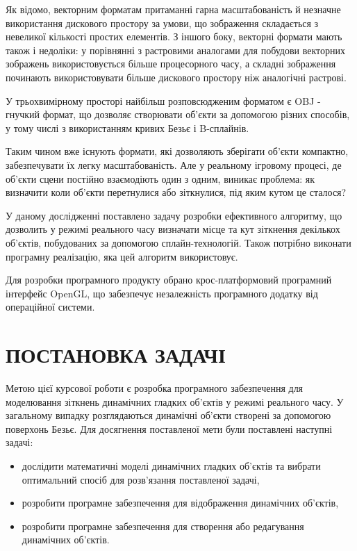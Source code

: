 \documentclass[14pt,a4paper]{extarticle}
\theoremstyle{definition}
\renewcommand{\[}{\begin{singlespace}\begin{equation*}}
\renewcommand{\]}{\end{equation*}\end{singlespace}}
\begin{document}
Як відомо, векторним форматам притаманні гарна масштабованість й незначне використання дискового простору за умови, що зображення складається з невеликої кількості простих елементів. З іншого боку, векторні формати мають також і недоліки: у порівнянні з растровими аналогами для побудови векторних зображень використовується більше процесорного часу, а складні зображення починають використовувати більше дискового простору ніж аналогічні растрові.

У трьохвимірному просторі найбільш розповсюдженим форматом є OBJ - гнучкий формат, що дозволяє створювати об'єкти за допомогою різних способів, у тому числі з використанням кривих Безьє і B-сплайнів.

Таким чином вже існують формати, які дозволяють зберігати об'єкти компактно, забезпечувати їх легку масштабованість. Але у реальному ігровому процесі, де об'єкти сцени постійно взаємодіють один з одним, виникає проблема: як визначити коли об'єкти перетнулися або зіткнулися, під яким кутом це сталося?

У даному дослідженні поставлено задачу розробки ефективного алгоритму, що дозволить у режимі реального часу визначати місце та кут зіткнення декількох об'єктів, побудованих за допомогою сплайн-технологій. Також потрібно виконати програмну реалізацію, яка цей алгоритм використовує.

Для розробки програмного продукту обрано крос-платформовий програмний інтерфейс OpenGL, що забезпечує незалежність програмного додатку від операційної системи.

\section*{ПОСТАНОВКА ЗАДАЧІ}

Метою цієї курсової роботи є розробка програмного забезпечення для моделювання зіткнень динамічних гладких об'єктів у режимі реального часу. У загальному випадку розглядаються динамічні об'єкти створені за допомогою поверхонь Безьє. Для досягнення поставленої мети були поставлені наступні задачі:

\begin{itemize}
\item дослідити математичні моделі динамічних гладких об'єктів та вибрати оптимальний спосіб для розв'язання поставленої задачі,
\item розробити програмне забезпечення для відображення динамічних об'єктів,
\item розробити програмне забезпечення для створення або редагування динамічних об'єктів.
\end{itemize}
\end{document}
